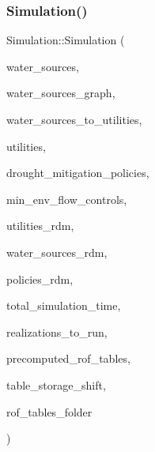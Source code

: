 \subsubsection{\texorpdfstring{Simulation()}{Simulation()}\hspace{0.1cm}{\footnotesize\ttfamily [2/3]}}
{\footnotesize\ttfamily Simulation\+::\+Simulation (\begin{DoxyParamCaption}\item[{vector$<$ \mbox{\hyperlink{classWaterSource}{Water\+Source}} $\ast$$>$ \&}]{water\+\_\+sources,  }\item[{\mbox{\hyperlink{classGraph}{Graph}} \&}]{water\+\_\+sources\+\_\+graph,  }\item[{const vector$<$ vector$<$ int $>$$>$ \&}]{water\+\_\+sources\+\_\+to\+\_\+utilities,  }\item[{vector$<$ \mbox{\hyperlink{classUtility}{Utility}} $\ast$$>$ \&}]{utilities,  }\item[{const vector$<$ \mbox{\hyperlink{classDroughtMitigationPolicy}{Drought\+Mitigation\+Policy}} $\ast$$>$ \&}]{drought\+\_\+mitigation\+\_\+policies,  }\item[{vector$<$ \mbox{\hyperlink{classMinEnvFlowControl}{Min\+Env\+Flow\+Control}} $\ast$$>$ \&}]{min\+\_\+env\+\_\+flow\+\_\+controls,  }\item[{vector$<$ vector$<$ double $>$$>$ \&}]{utilities\+\_\+rdm,  }\item[{vector$<$ vector$<$ double $>$$>$ \&}]{water\+\_\+sources\+\_\+rdm,  }\item[{vector$<$ vector$<$ double $>$$>$ \&}]{policies\+\_\+rdm,  }\item[{const unsigned long}]{total\+\_\+simulation\+\_\+time,  }\item[{vector$<$ unsigned long $>$ \&}]{realizations\+\_\+to\+\_\+run,  }\item[{vector$<$ vector$<$ \mbox{\hyperlink{classMatrix2D}{Matrix2D}}$<$ double $>$$>$$>$ \&}]{precomputed\+\_\+rof\+\_\+tables,  }\item[{vector$<$ vector$<$ double $>$$>$ \&}]{table\+\_\+storage\+\_\+shift,  }\item[{string \&}]{rof\+\_\+tables\+\_\+folder }\end{DoxyParamCaption})}

\mbox{\label{classSimulation_a68f43435cf8308d5415cdfcdb84e1fac_a68f43435cf8308d5415cdfcdb84e1fac}} 
